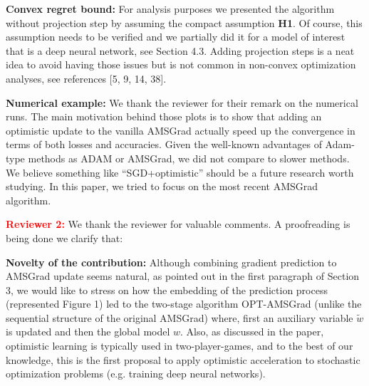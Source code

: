 \documentclass{article}
\begin{document}
\textbf{Convex regret bound:} 
For analysis purposes we presented the algorithm without projection step by assuming the compact assumption \textbf{H1}.
Of course, this assumption needs to be verified and we partially did it for a model of interest that is a deep neural network, see Section 4.3.
Adding projection steps is a neat idea to avoid having those issues but is not common in non-convex optimization analyses, see references [5, 9, 14, 38].\vspace{-5pt}

\textbf{Numerical example:} We thank the reviewer for their remark on the numerical runs. 
The main motivation behind those plots is to show that adding an optimistic update to the vanilla AMSGrad actually speed up the convergence in terms of both losses and accuracies.
Given the well-known advantages of Adam-type methods as ADAM or AMSGrad, we did not compare to slower methods.
We believe something like ``SGD+optimistic'' should be a future research worth studying. In this paper, we tried to focus on the most recent AMSGrad algorithm. \vspace{-5pt}

\vspace{0.05in}


\textbf{\textcolor{red}{Reviewer 2:}} We thank the reviewer for valuable comments. A proofreading is being done we clarify that:\vspace{-5pt}

\textbf{Novelty of the contribution:} 
Although combining gradient prediction to AMSGrad update seems natural, as pointed out in the first paragraph of Section 3, we would like to stress on how the embedding of the prediction process (represented Figure 1) led to the two-stage algorithm OPT-AMSGrad (unlike the sequential structure of the original AMSGrad) where, first an auxiliary variable $\tilde{w}$ is updated and then the global model $w$. 
Also, as discussed in the paper, optimistic learning is typically used in two-player-games, and to the best of our knowledge, this is the first proposal to apply optimistic acceleration to stochastic optimization problems (e.g. training deep neural networks). \vspace{-5pt}
\end{document}

